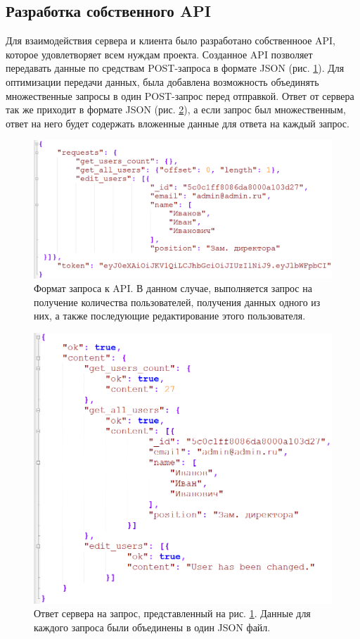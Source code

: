 \subsection{Разработка собственного API}
Для взаимодействия сервера и клиента было разработано собственноое API, которое удовлетворяет всем нуждам проекта.
Созданное API позволяет передавать данные по средствам POST-запроса в формате JSON (рис. \ref{fig:req}).
Для оптимизации передачи данных, была добавлена возможность объединять множественные запросы в один POST-запрос перед отправкой.
Ответ от сервера так же приходит в формате JSON (рис. \ref{fig:ans}), а если запрос был множественным,
ответ на него будет содержать вложенные данные для ответа на каждый запрос.
\begin{figure}[h]
    \centering
    \includegraphics[width=1\linewidth]{img/req.png}
    \caption{Формат запроса к API. В данном случае, выполняется запрос на получение количества пользователей,
    получения данных одного из них, а также последующие редактирование этого пользователя.}
    \label{fig:req}
\end{figure}

\begin{figure}[h]
    \centering
    \includegraphics[width=1\linewidth]{img/ans.png}
    \caption{Ответ сервера на запрос, представленный на рис. \ref{fig:req}. Данные для каждого запроса были объединены в один JSON файл.}
    \label{fig:ans}
\end{figure}


